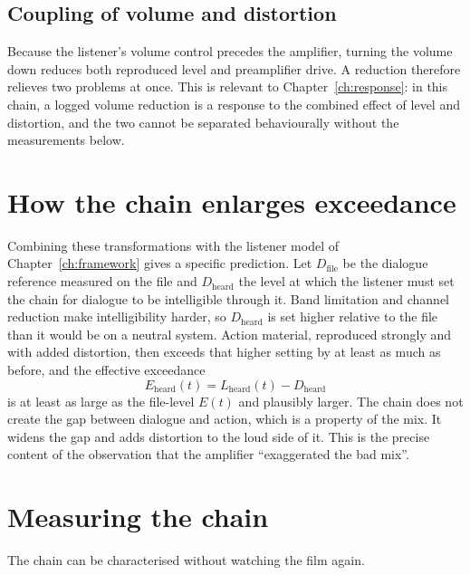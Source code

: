 \subsection{Coupling of volume and distortion}

Because the listener's volume control precedes the amplifier, turning the volume down reduces both reproduced level and preamplifier drive. A reduction therefore relieves two problems at once. This is relevant to Chapter~\ref{ch:response}: in this chain, a logged volume reduction is a response to the combined effect of level and distortion, and the two cannot be separated behaviourally without the measurements below.

\section{How the chain enlarges exceedance}

Combining these transformations with the listener model of Chapter~\ref{ch:framework} gives a specific prediction. Let $D_{\text{file}}$ be the dialogue reference measured on the file and $D_{\text{heard}}$ the level at which the listener must set the chain for dialogue to be intelligible through it. Band limitation and channel reduction make intelligibility harder, so $D_{\text{heard}}$ is set higher relative to the file than it would be on a neutral system. Action material, reproduced strongly and with added distortion, then exceeds that higher setting by at least as much as before, and the effective exceedance
\begin{equation}
E_{\text{heard}}(t) = L_{\text{heard}}(t) - D_{\text{heard}}
\end{equation}
is at least as large as the file-level $E(t)$ and plausibly larger. The chain does not create the gap between dialogue and action, which is a property of the mix. It widens the gap and adds distortion to the loud side of it. This is the precise content of the observation that the amplifier ``exaggerated the bad mix''.

\section{Measuring the chain}

The chain can be characterised without watching the film again.

